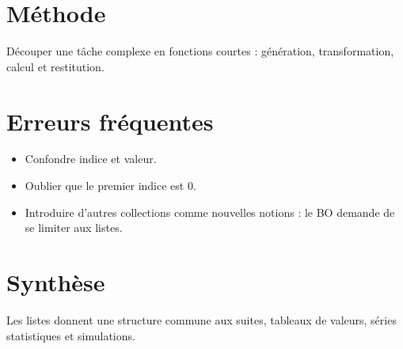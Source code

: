 \section{Méthode}
Découper une tâche complexe en fonctions courtes : génération, transformation, calcul et restitution.

\section{Erreurs fréquentes}
\begin{itemize}
\item Confondre indice et valeur.
\item Oublier que le premier indice est 0.
\item Introduire d’autres collections comme nouvelles notions : le BO demande de se limiter aux listes.
\end{itemize}

\section{Synthèse}
Les listes donnent une structure commune aux suites, tableaux de valeurs, séries statistiques et simulations.
